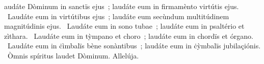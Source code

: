 \psalmChapterWithInscription{}
{ }
{%
audáte Dòminum in sanctïs ejus~; laudáte eum in firmamènto virtútis ejus. 
~Laudáte eum in virtútibus ejus~; laudáte eum secùndum multitúdinem magnitúdinis ejus. 
~Laudáte eum in sono tubae~; laudáte eum in psaltério et zìthara. 
~Laudáte eum in tỳmpano et choro~; laudáte eum in chordïs et órgano. 
~Laudáte eum in ċìmbalïs bène sonàntibus~; laudáte eum in ċỳmbalïs jubilaçiónis. 
~Òmnis spíritus laudet Dòminum. Allelúja. 
}
